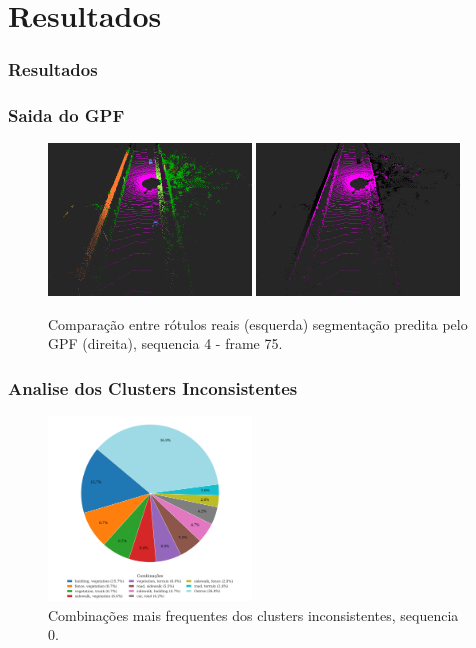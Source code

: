 \documentclass[aspectratio=169,t,xcolor=table]{beamer}
\begin{document}
\section{Resultados}

\begin{frame}
    \frametitle{Resultados}
\end{frame}

\begin{frame}
    \frametitle{Saida do GPF}
    \begin{figure}
        \centering
        \includegraphics[width=0.48\textwidth]{figs/label_2_s4f75.png}
        \hspace{0.02\textwidth}
        \includegraphics[width=0.48\textwidth]{figs/gpf_2_s4f75.png}
        \caption {Comparação entre rótulos reais (esquerda) segmentação predita
            pelo GPF (direita), sequencia 4 - frame 75.}
    \end{figure}
\end{frame}


\begin{frame}
    \frametitle{Analise dos Clusters Inconsistentes}
    \begin{figure}
        \centering
        \includegraphics[width=0.48\textwidth]{figs/plot-5.png}
        \caption {Combinações mais frequentes dos clusters inconsistentes, sequencia 0.}
    \end{figure}
\end{frame}
\end{document}
